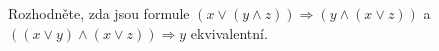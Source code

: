 Rozhodněte, zda jsou formule $(x\vee (y\wedge z)) \Rightarrow (y \wedge (x\vee
z))$ a $((x \vee y)  \wedge (x\vee z))\Rightarrow y$ ekvivalentní.

